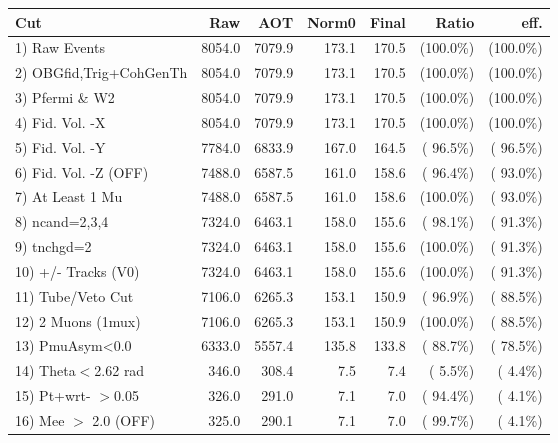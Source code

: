  \begin{table}[h!]\centering
 \begin{tabular}{||l||r|r|r|r|r|r||}
 \hline
 \hline
 Cut & Raw & AOT & Norm0 & Final & Ratio & eff.       \\
 \hline
  1) Raw Events           &       8054.0 &       7079.9 &        173.1 &        170.5 & (100.0\%) & (100.0\%) \\
  2) OBGfid,Trig+CohGenTh &       8054.0 &       7079.9 &        173.1 &        170.5 & (100.0\%) & (100.0\%) \\
  3) Pfermi \& W2         &       8054.0 &       7079.9 &        173.1 &        170.5 & (100.0\%) & (100.0\%) \\
  4) Fid. Vol. -X         &       8054.0 &       7079.9 &        173.1 &        170.5 & (100.0\%) & (100.0\%) \\
  5) Fid. Vol. -Y         &       7784.0 &       6833.9 &        167.0 &        164.5 & ( 96.5\%) & ( 96.5\%) \\
  6) Fid. Vol. -Z (OFF)   &       7488.0 &       6587.5 &        161.0 &        158.6 & ( 96.4\%) & ( 93.0\%) \\
  7) At Least 1 Mu        &       7488.0 &       6587.5 &        161.0 &        158.6 & (100.0\%) & ( 93.0\%) \\
  8) ncand=2,3,4          &       7324.0 &       6463.1 &        158.0 &        155.6 & ( 98.1\%) & ( 91.3\%) \\
  9) tnchgd=2             &       7324.0 &       6463.1 &        158.0 &        155.6 & (100.0\%) & ( 91.3\%) \\
 10) +/- Tracks (V0)      &       7324.0 &       6463.1 &        158.0 &        155.6 & (100.0\%) & ( 91.3\%) \\
 11) Tube/Veto Cut        &       7106.0 &       6265.3 &        153.1 &        150.9 & ( 96.9\%) & ( 88.5\%) \\
 12) 2 Muons (1mux)       &       7106.0 &       6265.3 &        153.1 &        150.9 & (100.0\%) & ( 88.5\%) \\
 13) PmuAsym<0.0          &       6333.0 &       5557.4 &        135.8 &        133.8 & ( 88.7\%) & ( 78.5\%) \\
 14) Theta$<$2.62 rad     &        346.0 &        308.4 &          7.5 &          7.4 & (  5.5\%) & (  4.4\%) \\
 15) Pt+wrt- $>$0.05      &        326.0 &        291.0 &          7.1 &          7.0 & ( 94.4\%) & (  4.1\%) \\
 16) Mee $>$ 2.0  (OFF)   &        325.0 &        290.1 &          7.1 &          7.0 & ( 99.7\%) & (  4.1\%) \\

\end{tabular}
\end{table}
